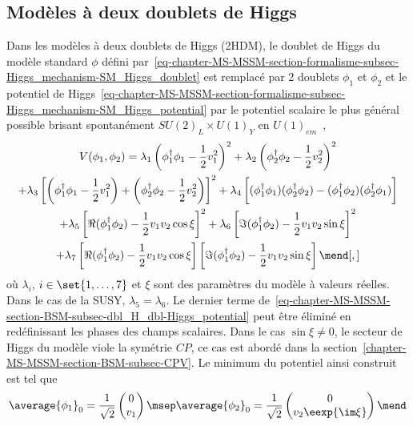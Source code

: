 \subsection{Modèles à deux doublets de Higgs}\label{chapter-MS-MSSM-section-BSM-subsec-dbl_H_dbl}
Dans les modèles à deux doublets de Higgs (2HDM),
le doublet de Higgs du modèle standard $\phi$ défini par~\eqref{eq-chapter-MS-MSSM-section-formalisme-subsec-Higgs_mechanism-SM_Higgs_doublet}
est remplacé par 2 doublets $\phi_1$ et $\phi_2$
et
le potentiel de Higgs~\eqref{eq-chapter-MS-MSSM-section-formalisme-subsec-Higgs_mechanism-SM_Higgs_potential}
par
le potentiel scalaire le plus général possible brisant spontanément $SU(2)_L \times U(1)_Y$ en $U(1)_{em}$~\cite{Higgs_hunter_guide,Higgs_hunter_guide_errata},
\begin{multline}
V(\phi_1,\phi_2)
= \lambda_1 \left(\phi_1^\dagger\phi_1 - \frac{1}{2} v_1^2\right)^2
+ \lambda_2 \left(\phi_2^\dagger\phi_2 - \frac{1}{2} v_2^2\right)^2
\\
+ \lambda_3 \left[ \left(\phi_1^\dagger\phi_1 - \frac{1}{2} v_1^2\right) + \left(\phi_2^\dagger\phi_2 - \frac{1}{2} v_2^2\right) \right]^2
+ \lambda_4 \left[ (\phi_1^\dagger\phi_1)(\phi_2^\dagger\phi_2) - (\phi_1^\dagger\phi_2)(\phi_2^\dagger\phi_1) \vphantom{\frac{1}{2}}\right]
\\
+ \lambda_5 \left[ \Re(\phi_1^\dagger\phi_2) - \frac{1}{2} v_1v_2\cos\xi \right]^2
+ \lambda_6 \left[ \Im(\phi_1^\dagger\phi_2) - \frac{1}{2} v_1v_2\sin\xi \right]^2
\\
+ \lambda_7 \left[ \Re(\phi_1^\dagger\phi_2) - \frac{1}{2} v_1v_2\cos\xi \right]\left[ \Im(\phi_1^\dagger\phi_2) - \frac{1}{2} v_1v_2\sin\xi \right]
\mend[,]
\label{eq-chapter-MS-MSSM-section-BSM-subsec-dbl_H_dbl-Higgs_potential}
\end{multline}
où $\lambda_i$, $i\in\set{1,\ldots,7}$ et $\xi$ sont des paramètres du modèle à valeurs réelles.
Dans le cas de la SUSY, $\lambda_5=\lambda_6$.
Le dernier terme de~\eqref{eq-chapter-MS-MSSM-section-BSM-subsec-dbl_H_dbl-Higgs_potential} peut être éliminé en redéfinissant les phases des champs scalaires.
Dans le cas $\sin\xi\neq0$, le secteur de Higgs du modèle viole la symétrie $CP$,
ce cas est abordé dans la section~\ref{chapter-MS-MSSM-section-BSM-subsec-CPV}.
Le minimum du potentiel ainsi construit est tel que
\begin{equation}
\average{\phi_1}_0 = \frac{1}{\sqrt{2}} \begin{pmatrix}
0\\v_1
\end{pmatrix}
\msep
\average{\phi_2}_0 = \frac{1}{\sqrt{2}} \begin{pmatrix}
0\\v_2 \eexp{\im\xi}
\end{pmatrix}
\mend
\end{equation}
